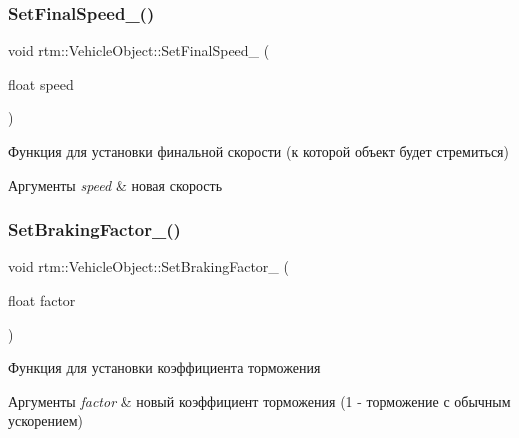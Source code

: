 \subsubsection{\texorpdfstring{Set\+Final\+Speed\+\_\+()}{SetFinalSpeed\_()}}
{\footnotesize\ttfamily void rtm\+::\+Vehicle\+Object\+::\+Set\+Final\+Speed\+\_\+ (\begin{DoxyParamCaption}\item[{float}]{speed }\end{DoxyParamCaption})\hspace{0.3cm}{\ttfamily [protected]}}

Функция для установки финальной скорости (к которой объект будет стремиться) 
\begin{DoxyParams}{Аргументы}
{\em speed} & новая скорость \\
\hline
\end{DoxyParams}
\mbox{\label{classrtm_1_1_vehicle_object_a3c2db832bf74ea5bd226e98e24b3da4b}} 
\subsubsection{\texorpdfstring{Set\+Braking\+Factor\+\_\+()}{SetBrakingFactor\_()}}
{\footnotesize\ttfamily void rtm\+::\+Vehicle\+Object\+::\+Set\+Braking\+Factor\+\_\+ (\begin{DoxyParamCaption}\item[{float}]{factor }\end{DoxyParamCaption})\hspace{0.3cm}{\ttfamily [protected]}}

Функция для установки коэффициента торможения 
\begin{DoxyParams}{Аргументы}
{\em factor} & новый коэффициент торможения (1 -\/ торможение с обычным ускорением) \\
\hline
\end{DoxyParams}
\mbox{\label{classrtm_1_1_vehicle_object_a124909b0d2443d501d9b1eb8d359ad5a}} 
